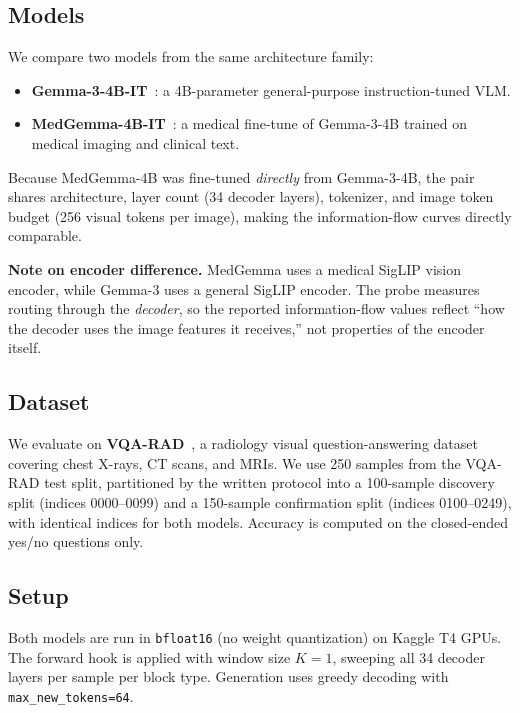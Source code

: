 \subsection{Models}

We compare two models from the same architecture family:
\begin{itemize}
  \item \textbf{Gemma-3-4B-IT}~\citep{gemma2025}: a 4B-parameter general-purpose
        instruction-tuned VLM.
  \item \textbf{MedGemma-4B-IT}~\citep{medgemma2025}: a medical fine-tune of
        Gemma-3-4B trained on medical imaging and clinical text.
\end{itemize}
Because MedGemma-4B was fine-tuned \emph{directly} from Gemma-3-4B, the pair shares
architecture, layer count (34 decoder layers), tokenizer, and image token budget
(256 visual tokens per image), making the information-flow curves directly comparable.

\textbf{Note on encoder difference.} MedGemma uses a medical SigLIP vision encoder,
while Gemma-3 uses a general SigLIP encoder. The probe measures routing through the
\emph{decoder}, so the reported information-flow values reflect ``how the decoder uses
the image features it receives,'' not properties of the encoder itself.

\subsection{Dataset}

We evaluate on \textbf{VQA-RAD}~\citep{lau2018dataset}, a radiology visual
question-answering dataset covering chest X-rays, CT scans, and MRIs. We use 250
samples from the VQA-RAD test split, partitioned by the written protocol into a
100-sample discovery split (indices 0000--0099) and a 150-sample confirmation split
(indices 0100--0249), with identical indices for both models. Accuracy is computed on
the closed-ended yes/no questions only.

\subsection{Setup}

Both models are run in \texttt{bfloat16} (no weight quantization) on Kaggle T4 GPUs.
The forward hook is applied with window size $K=1$, sweeping all 34 decoder layers
per sample per block type. Generation uses greedy decoding with
\texttt{max\_new\_tokens=64}.

